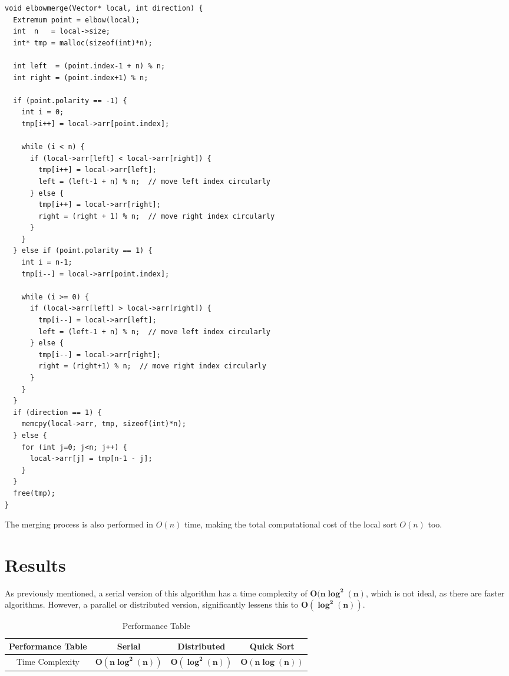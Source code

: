 \documentclass[12pt]{report}
\begin{document}
\begin{lstlisting}[style=cstyle]
void elbowmerge(Vector* local, int direction) {
  Extremum point = elbow(local);
  int  n   = local->size;
  int* tmp = malloc(sizeof(int)*n);

  int left  = (point.index-1 + n) % n;
  int right = (point.index+1) % n;

  if (point.polarity == -1) {  
    int i = 0;
    tmp[i++] = local->arr[point.index];  

    while (i < n) {
      if (local->arr[left] < local->arr[right]) {
        tmp[i++] = local->arr[left];
        left = (left-1 + n) % n;  // move left index circularly
      } else {
        tmp[i++] = local->arr[right];
        right = (right + 1) % n;  // move right index circularly
      }
    }
  } else if (point.polarity == 1) {  
    int i = n-1;
    tmp[i--] = local->arr[point.index];  

    while (i >= 0) {
      if (local->arr[left] > local->arr[right]) {
        tmp[i--] = local->arr[left];
        left = (left-1 + n) % n;  // move left index circularly
      } else {
        tmp[i--] = local->arr[right];
        right = (right+1) % n;  // move right index circularly
      }
    }
  }
  if (direction == 1) {
    memcpy(local->arr, tmp, sizeof(int)*n);
  } else {
    for (int j=0; j<n; j++) {
      local->arr[j] = tmp[n-1 - j];
    }
  }
  free(tmp);
}
\end{lstlisting}

The merging process is also performed in $O(n)$ time, making the total computational cost of the local sort $O(n)$ too.

\chapter{Results}
As previously mentioned, a serial version of this algorithm has a time complexity of $\boldsymbol{O(n \log^2(n)}$, which is not ideal, as there are faster algorithms. However, a parallel or distributed version, significantly lessens this to $\boldsymbol{O(\log^2(n))}$.

\begin{table}[h!]
    \centering
    \begin{tabular}{|c|c|c|c|}
        \hline
        \rule{0pt}{3ex}\textbf{Performance Table} & \textbf{Serial}                 & \textbf{Distributed}          & \textbf{Quick Sort}          \\ \hline
        \rule{0pt}{3ex}Time Complexity            & \(\boldsymbol{O(n \log^2(n))}\) & \(\boldsymbol{O(\log^2(n))}\) & \(\boldsymbol{O(n\log(n))}\) \\ \hline
    \end{tabular}
    \caption{Performance Table}
    \label{tab:simple_table}
\end{table}
\end{document}

